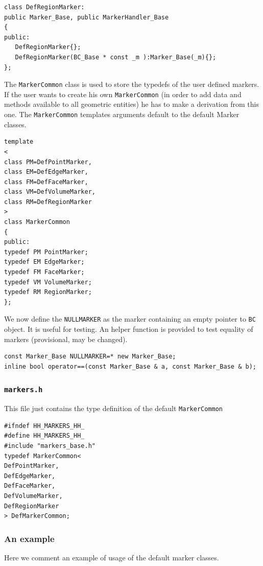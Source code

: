 \begin{verbatim}
class DefRegionMarker: 
public Marker_Base, public MarkerHandler_Base 
{
public:
   DefRegionMarker{};
   DefRegionMarker(BC_Base * const _m ):Marker_Base(_m){};
};

\end{verbatim}

The \texttt{MarkerCommon} class is used to store the typedefs of the
user defined markers. If the user wants to create his own
\texttt{MarkerCommon} (in order to add data and methods available to all
geometric entities) he has to make a derivation from this one.
The \texttt{MarkerCommon} templates arguments default to the default
Marker classes.

\begin{verbatim}
template
<
class PM=DefPointMarker,
class EM=DefEdgeMarker,
class FM=DefFaceMarker,
class VM=DefVolumeMarker,
class RM=DefRegionMarker
>
class MarkerCommon
{
public:
typedef PM PointMarker;
typedef EM EdgeMarker;
typedef FM FaceMarker;
typedef VM VolumeMarker;
typedef RM RegionMarker;
};
\end{verbatim}

We now define the \texttt{NULLMARKER} as the marker containing an
empty pointer to \texttt{BC} object.  It is useful for testing. An
helper function is provided to test equality of markers (provisional,
may be changed).

\begin{verbatim}
const Marker_Base NULLMARKER=* new Marker_Base; 
inline bool operator==(const Marker_Base & a, const Marker_Base & b);
\end{verbatim}


\subsubsection{\texttt{markers.h}}
This file just contains the type definition of the
default \texttt{MarkerCommon}
\begin{verbatim}
#ifndef HH_MARKERS_HH_
#define HH_MARKERS_HH_
#include "markers_base.h"
typedef MarkerCommon<
DefPointMarker,
DefEdgeMarker,
DefFaceMarker,
DefVolumeMarker,
DefRegionMarker
> DefMarkerCommon;
\end{verbatim}

\subsubsection{An example}
Here we comment an example of usage of the default marker classes.

